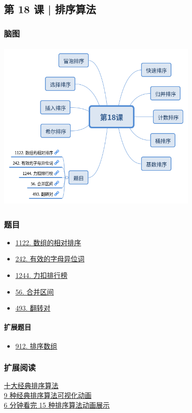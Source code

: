 \subsection{第 18 课 | 排序算法}

\subsubsection{脑图}

\includegraphics[width=100mm,height=86mm]{images/camp/第18课.png}

\subsubsection{题目}

\begin{itemize}
  \item \hyperref[leetcode:1122]{1122. 数组的相对排序}
  \item \hyperref[leetcode:242]{242. 有效的字母异位词}
  \item \hyperref[leetcode:1244]{1244. 力扣排行榜}
  \item \hyperref[leetcode:56]{56. 合并区间}
  \item \hyperref[leetcode:493]{493. 翻转对}
\end{itemize}

\paragraph{扩展题目}

\begin{itemize}
  \item \hyperref[leetcode:912]{912. 排序数组}
\end{itemize}

\subsubsection{扩展阅读}

\href{https://www.cnblogs.com/onepixel/p/7674659.html}{十大经典排序算法} \\
\href{https://www.bilibili.com/video/av25136272}{9 种经典排序算法可视化动画} \\
\href{https://www.bilibili.com/video/av63851336}{6 分钟看完 15 种排序算法动画展示}
